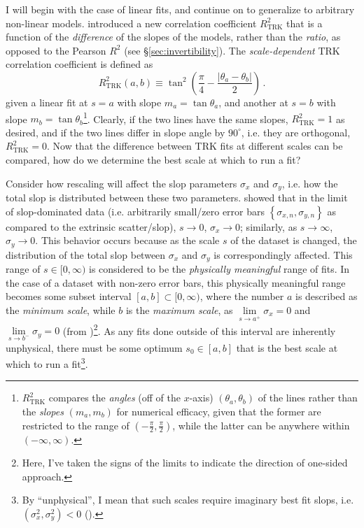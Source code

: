 I will begin with the case of linear fits, and continue on to generalize to arbitrary non-linear models. \textcite{trotter} introduced a new correlation coefficient $R^2_\text{TRK}$ that is a function of the \textit{difference} of the slopes of the models, rather than the \textit{ratio}, as opposed to the Pearson $R^2$ (see \S\ref{sec:invertibility}). The \textit{scale-dependent} TRK correlation coefficient is defined as
\begin{equation}\label{eq:r2TRKab}
R_{\mathrm{TRK}}^{2}(a,b)\equiv \tan^2\left(\frac{\pi}{4}-\frac{\left|\theta_a-\theta_b\right|}{2}\right) \, .
\end{equation}
given a linear fit at $s=a$ with slope $m_a=\tan{\theta_a}$, and another at $s=b$ with slope $m_b=\tan{\theta_b}$\footnote{$R^2_\text{TRK}$ compares the \textit{angles} (off of the $x$-axis) $\left(\theta_a,\theta_b\right)$ of the lines rather than the \textit{slopes} $\left(m_a,m_b\right)$ for numerical efficacy, given that the former are restricted to the range of $\left(-\frac{\pi}{2},\frac{\pi}{2}\right)$, while the latter can be anywhere within $(-\infty,\infty)$.}. Clearly, if the two lines have the same slopes, $R^2_\text{TRK}=1$ as desired, and if the two lines differ in slope angle by $90^\circ$, i.e. they are orthogonal, $R^2_\text{TRK}=0$. Now that the difference between TRK fits at different scales can be compared, how do we determine the best scale at which to run a fit?

Consider how rescaling will affect the slop parameters $\sigma_x$ and $\sigma_y$, i.e. how the total slop is distributed between these two parameters. \textcite{trotter} showed that in the limit of slop-dominated data (i.e. arbitrarily small/zero error bars $\left\{\sigma_{x,n},\sigma_{y,n}\right\}$ as compared to the extrinsic scatter/slop), $s\rightarrow 0$, $\sigma_x\rightarrow 0$; similarly, as $s\rightarrow \infty$, $\sigma_y\rightarrow 0$. This behavior occurs because as the scale $s$ of the dataset is changed, the distribution of the total slop between $\sigma_x$ and $\sigma_y$ is correspondingly affected. This range of $s\in[0,\infty)$ is considered to be the \textit{physically meaningful} range of fits. In the case of a dataset with non-zero error bars, this physically meaningful range becomes some subset interval $[a,b]\subset[0,\infty)$, where the number $a$ is described as the \textit{minimum scale}, while $b$ is the \textit{maximum scale}, as $\lim\limits_{s\rightarrow a^+}\sigma_x = 0$ and $\lim\limits_{s\rightarrow b^-}\sigma_y = 0$ (from \cite{trotter})\footnote{Here, I've taken the signs of the limits to indicate the direction of one-sided approach.}. As any fits done outside of this interval are inherently unphysical, there must be some optimum $s_0\in[a,b]$ that is the best scale at which to run a fit\footnote{By ``unphysical'', I mean that such scales require imaginary best fit slops, i.e. $(\sigma_x^2,\sigma_y^2)<0$ (\cite{trotter}).}.

